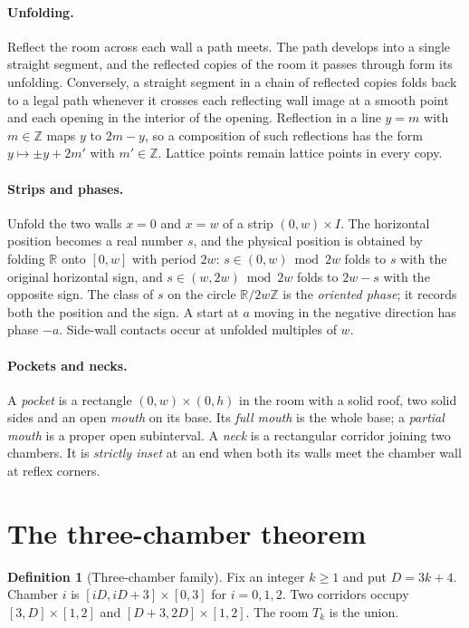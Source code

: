 \documentclass[11pt]{article}
\theoremstyle{definition}
\newtheorem{definition}{Definition}
\theoremstyle{remark}
\newcommand{\Z}{\mathbb Z}
\newcommand{\R}{\mathbb R}
\begin{document}
\paragraph{Unfolding.} Reflect the room across each wall a path meets. The path
develops into a single straight segment, and the reflected copies of the room
it passes through form its unfolding. Conversely, a straight segment in a chain
of reflected copies folds back to a legal path whenever it crosses each
reflecting wall image at a smooth point and each opening in the interior of the
opening. Reflection in a line $y=m$ with $m\in\Z$ maps $y$ to $2m-y$, so a
composition of such reflections has the form $y\mapsto \pm y+2m'$ with
$m'\in\Z$. Lattice points remain lattice points in every copy.

\paragraph{Strips and phases.} Unfold the two walls $x=0$ and $x=w$ of a strip
$(0,w)\times I$. The horizontal position becomes a real number $s$, and the
physical position is obtained by folding $\R$ onto $[0,w]$ with period $2w$:
$s\in(0,w)\bmod 2w$ folds to $s$ with the original horizontal sign, and
$s\in(w,2w)\bmod 2w$ folds to $2w-s$ with the opposite sign. The class of $s$
on the circle $\R/2w\Z$ is the \emph{oriented phase}; it records both the
position and the sign. A start at $a$ moving in the negative direction has
phase $-a$. Side-wall contacts occur at unfolded multiples of $w$.

\paragraph{Pockets and necks.} A \emph{pocket} is a rectangle
$(0,w)\times(0,h)$ in the room with a solid roof, two solid sides and an open
\emph{mouth} on its base. Its \emph{full mouth} is the whole base; a
\emph{partial mouth} is a proper open subinterval. A \emph{neck} is a
rectangular corridor joining two chambers. It is \emph{strictly inset} at an
end when both its walls meet the chamber wall at reflex corners.

\section{The three-chamber theorem}\label{sec:three}
\begin{definition}[Three-chamber family]\label{def:family}
Fix an integer $k\ge 1$ and put $D=3k+4$. Chamber $i$ is
$[iD,iD+3]\times[0,3]$ for $i=0,1,2$. Two corridors occupy
$[3,D]\times[1,2]$ and $[D+3,2D]\times[1,2]$. The room $T_k$ is the union.
\end{definition}
\end{document}
